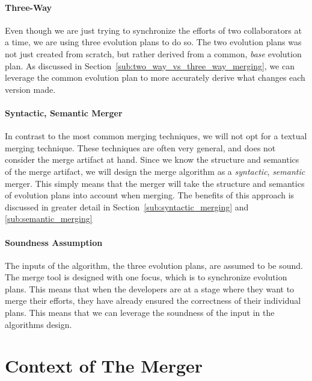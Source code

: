 \documentclass[a4paper,english]{ifimaster}
\begin{document}
\paragraph{Three-Way}%
\label{par:three_way}

Even though we are just trying to synchronize the efforts of two collaborators at a time, we are using three evolution plans to do so. The two evolution plans was not just created from scratch, but rather derived from a common, \textit{base} evolution plan. As discussed in Section~\vref{sub:two_way_vs_three_way_merging}, we can leverage the common evolution plan to more accurately derive what changes each version made.

\paragraph{Syntactic, Semantic Merger}%
\label{par:semantic_merger}

In contrast to the most common merging techniques, we will not opt for a textual merging technique. These techniques are often very general, and does not consider the merge artifact at hand. Since we know the structure and semantics of the merge artifact, we will design the merge algorithm as a \textit{syntactic}, \textit{semantic} merger. This simply means that the merger will take the structure and semantics of evolution plans into account when merging. The benefits of this approach is discussed in greater detail in Section~\vref{sub:syntactic_merging} and \vref{sub:semantic_merging}

\paragraph{Soundness Assumption}%
\label{par:soundness_assumption}

The inputs of the algorithm, the three evolution plans, are assumed to be sound. The merge tool is designed with one focus, which is to synchronize evolution plans. This means that when the developers are at a stage where they want to merge their efforts, they have already ensured the correctness of their individual plans. This means that we can leverage the soundness of the input in the algorithms design. 

\section{Context of The Merger}%
\label{sec:context_of_the_merger}
\end{document}
